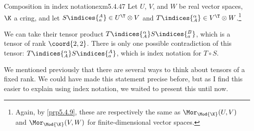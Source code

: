 \begin{exm}{Composition in index notation}{exm5.4.47}
Let $U$, $V$, and $W$ be real vector spaces, $\K$ a cring, and let $S\indices{^A_a}\in U^{\T}\otimes V$ and $T\indices{^{\alpha}_A}\in V^{\T}\otimes W$.\footnote{Again, by \cref{prp5.4.9}, these are respectively the same as $\Mor _{\Mod{\K}}(U,V)$ and $\Mor _{\Mod{\K}}(V,W)$ for finite-dimensional vector spaces.}

We can take their tensor product $T\indices{^{\alpha}_A}S\indices{^B_a}$, which is a tensor of rank $\coord{2,2}$.  There is only one possible contradiction of this  tensor:  $T\indices{^{\alpha}_A}S\indices{^A_a}$, which is index notation for $T\circ S$.
\end{exm}

We mentioned previously that there are several ways to think about tensors of a fixed rank.  We could have made this statement precise before, but as I find this easier to explain using index notation, we waited to present this until now.
